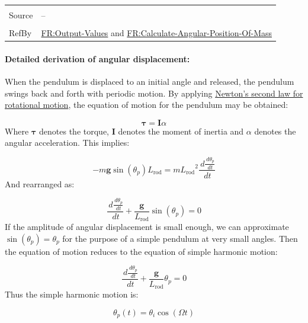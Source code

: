 \documentclass[12pt]{article}
\begin{document}
\begin{minipage}{\textwidth}
\begin{tabular}{>{\raggedright}p{}>{\raggedright\arraybackslash}p{}}
\\ \midrule \\
Source & --
         
\\ \midrule \\
RefBy & \hyperref[outputValues]{FR:Output-Values} and \hyperref[calcAngPos]{FR:Calculate-Angular-Position-Of-Mass}
        
\\ \bottomrule
\end{tabular}
\end{minipage}
\paragraph{Detailed derivation of angular displacement:}
\label{IM:calOfAngularDisplacementDeriv}
When the pendulum is displaced to an initial angle and released, the pendulum swings back and forth with periodic motion. By applying \hyperref[TM:NewtonSecLawRotMot]{Newton's second law for rotational motion}, the equation of motion for the pendulum may be obtained:

\begin{displaymath}
\symbf{τ}=\symbf{I} α
\end{displaymath}
Where $\symbf{τ}$ denotes the torque, $\symbf{I}$ denotes the moment of inertia and $α$ denotes the angular acceleration. This implies:

\begin{displaymath}
-m \symbf{g} \sin\left({θ_{p}}\right) {L_{\text{rod}}}=m {L_{\text{rod}}}^{2} \frac{\,d\frac{\,d{θ_{p}}}{\,dt}}{\,dt}
\end{displaymath}
And rearranged as:

\begin{displaymath}
\frac{\,d\frac{\,d{θ_{p}}}{\,dt}}{\,dt}+\frac{\symbf{g}}{{L_{\text{rod}}}} \sin\left({θ_{p}}\right)=0
\end{displaymath}
If the amplitude of angular displacement is small enough, we can approximate $\sin\left({θ_{p}}\right)={θ_{p}}$ for the purpose of a simple pendulum at very small angles. Then the equation of motion reduces to the equation of simple harmonic motion:

\begin{displaymath}
\frac{\,d\frac{\,d{θ_{p}}}{\,dt}}{\,dt}+\frac{\symbf{g}}{{L_{\text{rod}}}} {θ_{p}}=0
\end{displaymath}
Thus the simple harmonic motion is:

\begin{displaymath}
{θ_{p}}\left(t\right)={θ_{i}} \cos\left(Ω t\right)
\end{displaymath}
\end{document}
